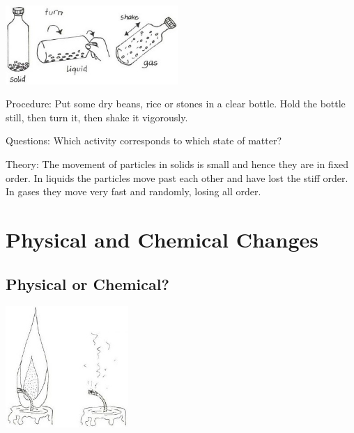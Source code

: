 \begin{multicols}{2}
\begin{center}
\includegraphics[width=0.49\textwidth]{./img/vso/motion-model.jpg}
\end{center}

\begin{description*}
\item[Procedure:]{Put some dry beans, rice or stones in a clear bottle. Hold the bottle still, then turn it, then shake it vigorously.}
\item[Questions:]{Which activity corresponds to which state of matter?}
\item[Theory:]{The movement of particles in solids is small and hence they are in fixed order. In liquids the particles move past each other and have lost the stiff order. In gases they move very fast and randomly, losing all order.}
\end{description*}


\section*{Physical and Chemical Changes}


\subsection{Physical or Chemical?}

\begin{center}
\includegraphics[width=0.35\textwidth]{./img/source/physical-change.jpg}
\end{center}


\end{multicols}
